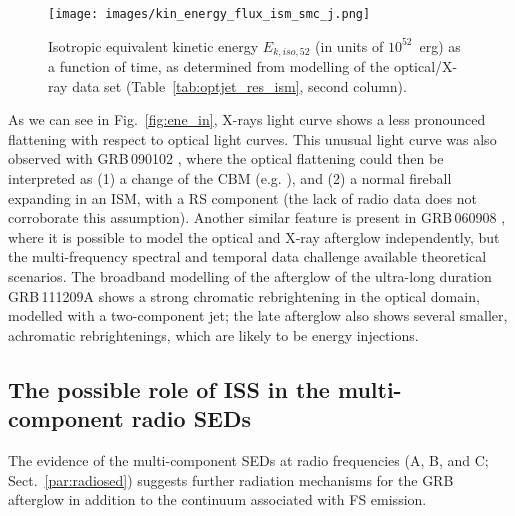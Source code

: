 \documentclass{aa}
\begin{document}
\begin{figure} %
\centering
{\texttt{[image: images/kin\_energy\_flux\_ism\_smc\_j.png]}}
\caption{Isotropic equivalent kinetic energy $E_{k,iso,52}$ (in units of $10^{52}$~erg) as a function of time, as determined from modelling of the optical/X-ray data set (Table~\ref{tab:optjet_res_ism}, second column).}
\label{fig:kin_ene}
\end{figure}
%
As we can see in Fig.~\ref{fig:ene_in}, X-rays light curve shows a less pronounced flattening with respect to optical light curves.
This unusual light curve was also observed with GRB\,090102 \citep{Gendre10}, where the optical flattening could then be interpreted as (1) a change of the CBM (e.g. \citealp{RamirezRuiz01b,Chevalier04}), and (2) a normal fireball expanding in an ISM, with a RS component (the lack of radio data does not corroborate this assumption).
Another similar feature is present in GRB\,060908 \citep{Covino10}, where it is possible to model the optical and X-ray afterglow independently, but the multi-frequency spectral and temporal data challenge available theoretical scenarios.
The broadband modelling of the afterglow of the ultra-long duration GRB\,111209A \citep{Kann18} shows a strong chromatic rebrightening in the optical domain, modelled with a two-component jet; the late afterglow also shows several smaller, achromatic rebrightenings, which are likely to be energy injections.


\subsection{The possible role of ISS in the multi-component radio SEDs}
\label{par:reverse}

The evidence of the multi-component SEDs at radio frequencies (A, B, and C; Sect.~\ref{par:radiosed}) suggests further radiation mechanisms for the GRB afterglow in addition to the continuum associated with FS emission.
\end{document}
